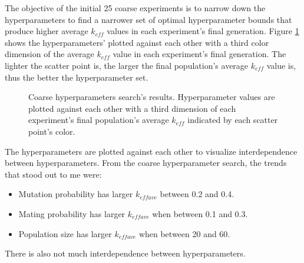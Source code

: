 The objective of the initial 25 coarse experiments is to narrow down the 
hyperparameters to find a narrower set of optimal hyperparameter bounds that 
produce higher average $k_{eff}$ values in each experiment's final generation. 
Figure \ref{fig:hyperparameter_sens} shows the hyperparameters' plotted against 
each other with a third color dimension of the average $k_{eff}$ value in each 
experiment's final generation. 
The lighter the scatter point is, the larger the final population's 
average $k_{eff}$ value is, thus the better the hyperparameter set. 
\begin{figure}[]
    \centering
    \caption{Coarse hyperparameters search's results. Hyperparameter values are plotted 
    against each other with a third dimension of each experiment's final population's 
    average $k_{eff}$ indicated by each scatter point's color.}
    \label{fig:hyperparameter_sens}
\end{figure}
The hyperparameters are plotted against each other to visualize interdependence 
between hyperparameters. 
From the coarse hyperparameter search, the trends that stood out to me were: 
\begin{itemize}
    \item Mutation probability has larger $k_{eff ave}$ between 0.2 and 0.4. 
    \item Mating probability has larger $k_{eff ave}$ when between 0.1 and 0.3. 
    \item Population size has larger $k_{eff ave}$ when between 20 and 60. 
\end{itemize}
There is also not much interdependence between hyperparameters. 

